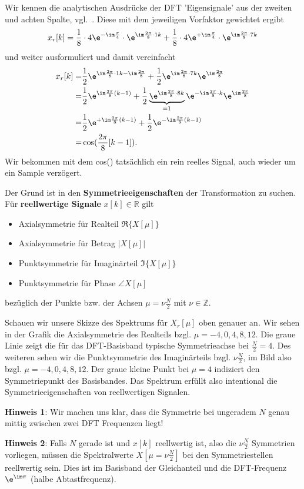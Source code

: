 \begin{ExCalc}
Wir kennen die analytischen Ausdrücke der DFT 'Eigensignale' aus der zweiten
und achten Spalte, vgl.~.
Diese mit dem jeweiligen Vorfaktor gewichtet ergibt
\begin{align}
x_r[k]
=
\frac{1}{8} \cdot 4 \e^{-\im\frac{\pi}{4}} \cdot  \e^{\im \frac{2\pi}{8}\cdot 1 k}+
\frac{1}{8} \cdot 4 \e^{+\im\frac{\pi}{4}} \cdot  \e^{\im \frac{2\pi}{8}\cdot 7 k}
\end{align}
%
und weiter ausformuliert und damit vereinfacht
\begin{align}
x_r[k]
=
&\frac{1}{2} \e^{\im \frac{2\pi}{8}\cdot 1 k - \im\frac{2\pi}{8}}+
\frac{1}{2} \e^{\im \frac{2\pi}{8}\cdot 7 k} \e^{\im\frac{2\pi}{8}}\\
=
&\frac{1}{2} \e^{\im \frac{2\pi}{8} (k-1)}+
\frac{1}{2} \underbrace{\e^{\im \frac{2\pi}{8}\cdot 8 k}}_{=1} \e^{- \im \frac{2\pi}{8}\cdot k} \e^{\im\frac{2\pi}{8}}\\
=
&\frac{1}{2} \e^{+\im \frac{2\pi}{8} (k-1)}+
\frac{1}{2} \e^{-\im \frac{2\pi}{8} (k-1)}\\
=
&\cos(\frac{2\pi}{8} [k-1]).
\end{align}
Wir bekommen mit dem cos() tatsächlich ein rein reelles Signal, auch wieder
um ein Sample verzögert.

Der Grund ist in den \textbf{Symmetrieeigenschaften} der Transformation zu
suchen. Für \textbf{reellwertige Signale} $x[k]\in\mathbb{R}$ gilt
\begin{itemize}
  \item Axialsymmetrie für Realteil $\Re\{X[\mu]\}$
  \item Axialsymmetrie für Betrag $|X[\mu]|$
  \item Punktsymmetrie für Imaginärteil $\Im\{X[\mu]\}$
  \item Punktsymmetrie für Phase $\angle X[\mu]$
\end{itemize}
bezüglich der Punkte bzw. der Achsen $\mu = \nu \frac{N}{2}$ mit $\nu\in\mathbb{Z}$.

Schauen wir unsere Skizze des Spektrums für $X_r[\mu]$ oben genauer an.
Wir sehen in der Grafik die Axialsymmetrie des Realteils
bzgl. $\mu=-4,0,4,8,12$. Die graue
Linie zeigt die für das DFT-Basisband typische Symmetrieachse bei $\frac{N}{2}=4$.
Des weiteren sehen wir die Punktsymmetrie des Imaginärteils bzgl. $\nu \frac{N}{2}$,
im Bild also bzgl. $\mu=-4,0,4,8,12$. Der graue kleine Punkt bei $\mu=4$ indiziert
den Symmetriepunkt des Basisbandes.
Das Spektrum erfüllt also intentional
die Symmetrieeigenschaften von reellwertigen Signalen.

\textbf{Hinweis 1}: Wir machen uns klar, dass die Symmetrie bei ungeradem $N$
genau mittig zwischen zwei DFT Frequenzen liegt!

\textbf{Hinweis 2}:
Falls $N$ gerade ist und $x[k]$ reellwertig ist, also die $\nu \frac{N}{2}$
Symmetrien vorliegen, müssen die Spektralwerte $X[\mu = \nu \frac{N}{2}]$
bei den Symmetriestellen reellwertig sein.
Dies ist im Basisband der Gleichanteil und die DFT-Frequenz
$\e^{\im\pi}$ (halbe Abtastfrequenz).
\end{ExCalc}





